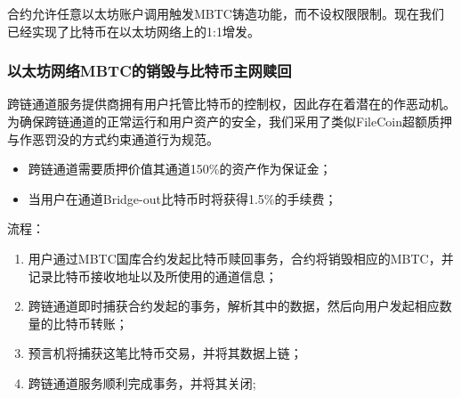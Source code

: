 \documentclass{article}
\begin{document}
\par 合约允许任意以太坊账户调用触发MBTC铸造功能，而不设权限限制。现在我们已经实现了比特币在以太坊网络上的1:1增发。

\subsubsection{以太坊网络MBTC的销毁与比特币主网赎回}
\par 跨链通道服务提供商拥有用户托管比特币的控制权，因此存在着潜在的作恶动机。为确保跨链通道的正常运行和用户资产的安全，我们采用了类似FileCoin超额质押与作恶罚没的方式约束通道行为规范。
\begin{itemize}
    \item 跨链通道需要质押价值其通道150\%的资产作为保证金；
    \item 当用户在通道Bridge-out比特币时将获得1.5\%的手续费；
\end{itemize}
流程：
\begin{enumerate}
    \item 用户通过MBTC国库合约发起比特币赎回事务，合约将销毁相应的MBTC，并记录比特币接收地址以及所使用的通道信息；
    \item 跨链通道即时捕获合约发起的事务，解析其中的数据，然后向用户发起相应数量的比特币转账；
    \item 预言机将捕获这笔比特币交易，并将其数据上链；
    \item 跨链通道服务顺利完成事务，并将其关闭;
\end{enumerate}
\end{document}
